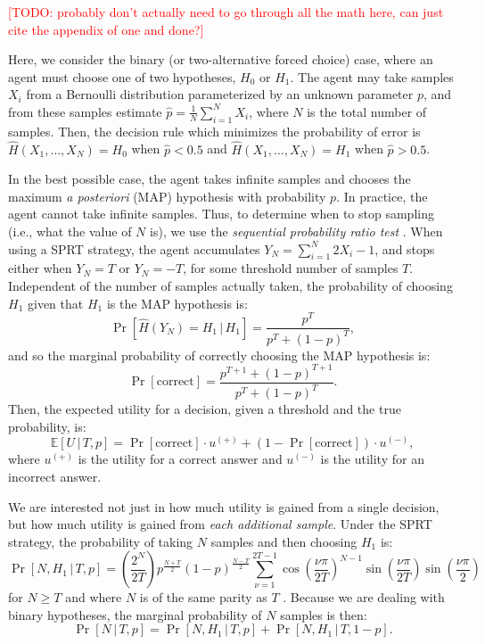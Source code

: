\documentclass[10pt,letterpaper]{article}
\newcommand{\TODO}[1]{\textcolor{red}{[TODO: #1]}}
\begin{document}
\TODO{probably don't actually need to go through all the math here, can just cite the appendix of one and done?}

Here, we consider the binary (or two-alternative forced choice) case, where an agent must choose one of two hypotheses, $H_0$ or $H_1$. The agent may take samples $X_i$ from a Bernoulli distribution parameterized by an unknown parameter $p$, and from these samples estimate $\hat{p}=\frac{1}{N}\sum_{i=1}^N X_i$, where $N$ is the total number of samples. Then, the decision rule which minimizes the probability of error is $\hat{H}(X_1,\ldots{},X_N)=H_0$ when $\hat{p}<0.5$ and $\hat{H}(X_1,\ldots{},X_N)=H_1$ when $\hat{p}>0.5$.

In the best possible case, the agent takes infinite samples and chooses the maximum \emph{a posteriori} (MAP) hypothesis with probability $p$. In practice, the agent cannot take infinite samples. Thus, to determine when to stop sampling (i.e., what the value of $N$ is), we use the \emph{sequential probability ratio test} \cite{wald1947sequential}. When using a SPRT strategy, the agent accumulates $Y_N=\sum_{i=1}^N 2X_i-1$, and stops either when $Y_N=T$ or $Y_N=-T$, for some threshold number of samples $T$. Independent of the number of samples actually taken, the probability of choosing $H_1$ given that $H_1$ is the MAP hypothesis is:
\begin{equation}
\Pr[\hat{H}(Y_N)=H_1\,|\,H_1]=\frac{p^T}{p^T+(1-p)^T},
\label{eq:pr-choose-h1}
\end{equation}
and so the marginal probability of correctly choosing the MAP hypothesis is:
\begin{equation}
\Pr[\mathrm{correct}]=\frac{p^{T+1}+(1-p)^{T+1}}{p^T+(1-p)^T}.
\label{eq:pr-correct}
\end{equation}
Then, the expected utility for a decision, given a threshold and the true probability, is:
\begin{equation}
\mathbb{E}[U\,|\,T,p]=\Pr[\mathrm{correct}]\cdot{}u^{(+)}+(1-\Pr[\mathrm{correct}])\cdot{}u^{(-)},
\label{eq:expected-utility}
\end{equation}
where $u^{(+)}$ is the utility for a correct answer and $u^{(-)}$ is the utility for an incorrect answer.

We are interested not just in how much utility is gained from a single decision, but how much utility is gained from \emph{each additional sample}. Under the SPRT strategy, the probability of taking $N$ samples and then choosing $H_1$ is:
\begin{equation}
\Pr[N,H_1\,|\,T,p]=\left(\frac{2^N}{2T}\right)p^{\frac{N+T}{2}}(1-p)^{\frac{N-T}{2}}\sum_{\nu=1}^{2T-1}\cos\left(\frac{\nu\pi}{2T}\right)^{N-1}\sin\left(\frac{\nu\pi}{2T}\right)\sin\left(\frac{\nu\pi}{2}\right)
\end{equation}
for $N\geq T$ and where $N$ is of the same parity as $T$ \cite[ch.~XIV, eq. 5.7]{Feller:1968ut}. Because we are dealing with binary hypotheses, the marginal probability of $N$ samples is then:
\begin{equation}
\Pr[N\,|\,T,p]=\Pr[N,H_1\,|\,T,p]+\Pr[N,H_1\,|\,T,1-p].
\label{eq:pr-n}
\end{equation}
\end{document}
